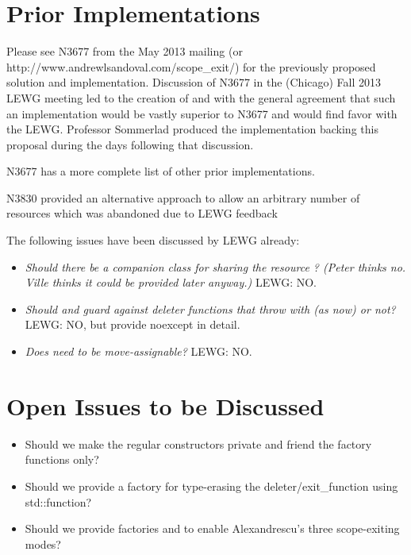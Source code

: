 \documentclass[ebook,11pt,article]{memoir}
\begin{document}
\section{Prior Implementations}
Please see N3677 from the May 2013 mailing (or http://www.andrewlsandoval.com/scope_exit/) for the previously proposed solution and implementation.  Discussion of N3677 in the (Chicago) Fall 2013 LEWG meeting led to the creation of  and  with the general agreement that such an implementation would be vastly superior to N3677 and would find favor with the LEWG.  Professor Sommerlad produced the implementation backing this proposal during the days following that discussion.

N3677 has a more complete list of other prior implementations.

N3830 provided an alternative approach to allow an arbitrary number of resources which was abandoned due to LEWG feedback 

The following issues have been discussed by LEWG already:
\begin{itemize}
\item \textit{Should there be a companion class for sharing the resource  ?  (Peter thinks no. Ville thinks it could be provided later anyway.) } LEWG: NO.
\item \textit{Should  and  guard against deleter functions that throw with  (as now) or not?} LEWG: NO, but provide noexcept in detail.
\item \textit{Does  need to be move-assignable? } LEWG: NO.
\end{itemize}


\section{Open Issues to be Discussed}
\begin{itemize}
\item Should we make the regular constructors private and friend the factory functions only?
\item Should we provide a factory for type-erasing the deleter/exit_function using std::function?
\item Should we provide factories  and  to enable Alexandrescu's three scope-exiting modes?
\end{itemize}
\end{document}
